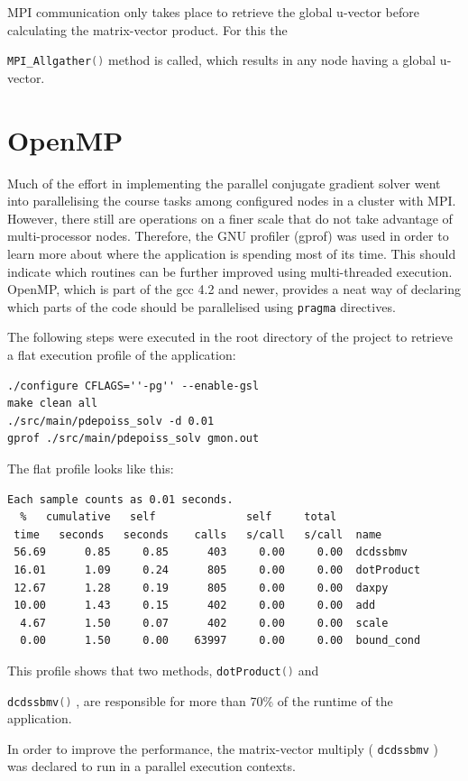 \documentclass[12pt,a4paper]{report}
\def\ccode#1{
  \lstinline[basicstyle=\ttfamily,language=C]{#1} }
\begin{document}
MPI communication only takes place to retrieve the global u-vector
before calculating the matrix-vector product. For this the
\ccode{MPI_Allgather()} method is called, which results in any node
having a global u-vector.

\section{OpenMP}
\label{sec:openmp}

Much of the effort in implementing the parallel conjugate gradient
solver went into parallelising the course tasks among configured nodes
in a cluster with MPI. However, there still are operations on a finer
scale that do not take advantage of multi-processor nodes. Therefore,
the GNU profiler (gprof) was used in order to learn more about where
the application is spending most of its time. This should indicate
which routines can be further improved using multi-threaded
execution. OpenMP, which is part of the gcc 4.2 and newer, provides a
neat way of declaring which parts of the code should be parallelised
using \ccode{pragma} directives.

The following steps were executed in the root directory of the project
to retrieve a flat execution profile of the application:

\begin{verbatim}
./configure CFLAGS=''-pg'' --enable-gsl
make clean all
./src/main/pdepoiss_solv -d 0.01
gprof ./src/main/pdepoiss_solv gmon.out
\end{verbatim}

The flat profile looks like this:
\begin{verbatim}
Each sample counts as 0.01 seconds.
  %   cumulative   self              self     total
 time   seconds   seconds    calls   s/call   s/call  name
 56.69      0.85     0.85      403     0.00     0.00  dcdssbmv
 16.01      1.09     0.24      805     0.00     0.00  dotProduct
 12.67      1.28     0.19      805     0.00     0.00  daxpy
 10.00      1.43     0.15      402     0.00     0.00  add
  4.67      1.50     0.07      402     0.00     0.00  scale
  0.00      1.50     0.00    63997     0.00     0.00  bound_cond
\end{verbatim}

This profile shows that two methods, \ccode{dotProduct()} and
\ccode{dcdssbmv()}, are responsible for more than 70\% of the runtime
of the application.

In order to improve the performance, the matrix-vector multiply
(\ccode{dcdssbmv}) was declared to run in a parallel execution
contexts.
\end{document}
